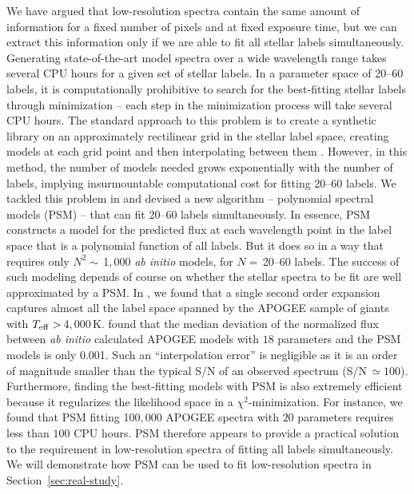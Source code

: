 \documentclass[iop]{emulateapj}
\begin{document}
\begin{CJK*}{UTF8}{gbsn}
We have argued that low-resolution spectra contain the same amount of information for a fixed number of pixels and at fixed exposure time, but we can extract this information only if we are able to fit all stellar labels simultaneously. Generating state-of-the-art model spectra over a wide wavelength range takes several CPU hours for a given set of stellar labels. In a parameter space of 20--60 labels, it is computationally prohibitive to search for the best-fitting stellar labels through minimization -- each step in the minimization process will take several CPU hours. The standard approach to this problem is to create a synthetic library on an approximately rectilinear grid in the stellar label space, creating models at each grid point and then interpolating between them \citep[e.g.,][]{gar16}. However, in this method, the number of models needed grows exponentially with the number of labels, implying insurmountable computational cost for fitting 20--60 labels. We tackled this problem in \citet{rix16,tin16} and devised a new algorithm -- polynomial spectral models (PSM) -- that can fit 20--60 labels simultaneously. In essence, PSM constructs a model for the predicted flux at each wavelength point in the label space that is a polynomial function of all labels. But it does so in a way that requires only $N^2 \sim \,$1$,$000 {\it ab initio} models, for $N = \,$20--60 labels. The success of such modeling depends of course on whether the stellar spectra to be fit are well approximated by a PSM. In \citet{rix16}, we found that a single second order expansion captures almost all the label space spanned by the APOGEE sample of giants with $T_{\rm eff}> \,$4$,$000$\,$K. \citet{rix16} found that the median deviation of the normalized flux between {\it ab initio} calculated APOGEE models with $18$ parameters and the PSM models is only 0.001. Such an ``interpolation error'' is negligible as it is an order of magnitude smaller than the typical S/N of an observed spectrum (S/N$\,\simeq 100$). Furthermore, finding the best-fitting models with PSM is also extremely efficient because it regularizes the likelihood space in a $\chi^2$-minimization. For instance, we found that PSM fitting 100$,$000 APOGEE spectra with $20$ parameters requires less than $100$ CPU hours. PSM therefore appears to provide a practical solution to the requirement in low-resolution spectra of fitting all labels simultaneously. We will demonstrate how PSM can be used to fit low-resolution spectra in Section~\ref{sec:real-study}. 


\end{CJK*}
\end{document}
